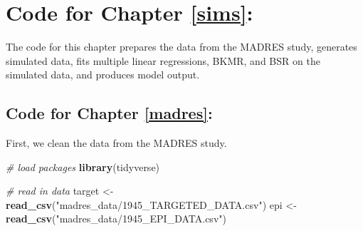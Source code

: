 \documentclass[12pt, twoside]{amherstthesis}
\newenvironment{Shaded}{\begin{snugshade}}{\end{snugshade}}
\newcommand{\CommentTok}[1]{\textcolor[rgb]{0.56,0.35,0.01}{\textit{#1}}}
\newcommand{\FunctionTok}[1]{\textcolor[rgb]{0.13,0.29,0.53}{\textbf{#1}}}
\newcommand{\NormalTok}[1]{#1}
\newcommand{\OtherTok}[1]{\textcolor[rgb]{0.56,0.35,0.01}{#1}}
\newcommand{\StringTok}[1]{\textcolor[rgb]{0.31,0.60,0.02}{#1}}
\begin{document}
\hypertarget{code-for-chapter-refsims}{%
\section{Code for Chapter \ref{sims}:}\label{code-for-chapter-refsims}}

The code for this chapter prepares the data from the MADRES study, generates simulated data, fits multiple linear regressions, BKMR, and BSR on the simulated data, and produces model output.

\hypertarget{code-for-chapter-refmadres}{%
\subsection{Code for Chapter \ref{madres}:}\label{code-for-chapter-refmadres}}

First, we clean the data from the MADRES study.

\scriptsize
\begin{Shaded}
\begin{Highlighting}[]
\CommentTok{\# load packages}
\FunctionTok{library}\NormalTok{(tidyverse)}
\end{Highlighting}
\end{Shaded}
\normalsize

\scriptsize
\begin{Shaded}
\begin{Highlighting}[]
\CommentTok{\# read in data}
\NormalTok{target }\OtherTok{\textless{}{-}} \FunctionTok{read\_csv}\NormalTok{(}\StringTok{"madres\_data/1945\_TARGETED\_DATA.csv"}\NormalTok{)}
\NormalTok{epi }\OtherTok{\textless{}{-}} \FunctionTok{read\_csv}\NormalTok{(}\StringTok{"madres\_data/1945\_EPI\_DATA.csv"}\NormalTok{)}
\end{Highlighting}
\end{Shaded}
\normalsize
\end{document}
